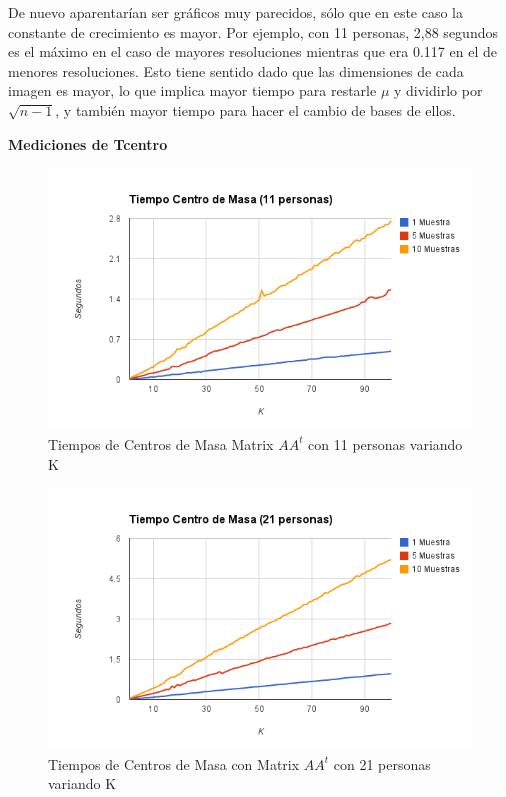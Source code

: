 De nuevo aparentarían ser gráficos muy parecidos, sólo que en este caso la constante de crecimiento es mayor.
Por ejemplo, con 11 personas, 2,88 segundos es el máximo en el caso de mayores resoluciones mientras
que era  0.117 en el de menores resoluciones.  Esto tiene sentido dado que las dimensiones de cada
imagen es mayor, lo que implica mayor tiempo para restarle $\mu$ y dividirlo por $\sqrt{n-1}$, y
también mayor tiempo para hacer el cambio de bases de ellos.

\textbf{Mediciones de Tcentro }

\begin{figure}[H] \includegraphics[width=1\textwidth]{img/imagef7.png} \caption{Tiempos de Centros
    de Masa Matrix $AA^t$ con 11 personas variando K} \end{figure}

\begin{figure}[H] \includegraphics[width=1\textwidth]{img/imagef8.png} \caption{Tiempos de Centros
    de Masa con Matrix $AA^t$ con 21 personas variando K} \end{figure}

